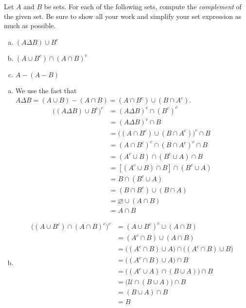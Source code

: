 \documentclass[11pt,letterpaper]{article}
\begin{document}

 Let $A$ and $B$ be sets. For each of the following sets, compute the \textit{complement} of the given set. Be sure to show all your work and simplify your set expression as much as possible. 
	\begin{enumerate}[(a)]
	\item $(A \Delta B) \cup B^c$
	\item $(A \cup B^c) \cap (A \cap B)^c$
	\item$A - (A - B)$
	\end{enumerate} \pspace

\sol 
\begin{enumerate}[(a)]
\item We use the fact that $A \Delta B= (A \cup B) - (A \cap B)= (A \cap B^c) \cup (B \cap A^c)$. 
	\[
	\begin{aligned}
	\big( (A \Delta B) \cup B^c \big)^c&= (A \Delta B)^c \cap (B^c)^c \\
	&= (A \Delta B)^c \cap B \\
	&= \big( (A \cap B^c) \cup (B \cap A^c) \big)^c \cap B \\
	&= (A \cap B^c)^c \cap (B \cap A^c)^c \cap B \\
	&= (A^c \cup B) \cap (B^c \cup A) \cap B \\
	&= \left[ (A^c \cup B) \cap B \right] \cap (B^c \cup A) \\
	&= B \cap (B^c \cup A) \\
	&= (B \cap B^c) \cup (B \cap A) \\
	&= \varnothing \cup (A \cap B) \\
	&= A \cap B
	\end{aligned}
	\] \pspace

\item 
	\[
	\begin{aligned}
	\big( (A \cup B^c) \cap (A \cap B)^c \big)^c&= (A \cup B^c)^c \cup (A \cap B) \\
	&= (A^c \cap B) \cup (A \cap B) \\
	&= \big( (A^c \cap B) \cup A \big) \cap \big( (A^c \cap B) \cup B \big) \\
	&= \big( (A^c \cap B) \cup A \big) \cap B \\
	&= \big( (A^c \cup A) \cap (B \cup A) \big) \cap B \\
	&= \big( \mathcal{U} \cap (B \cup A) \big) \cap B \\
	&= (B \cup A) \cap B \\
	&= B
	\end{aligned}
	\] 


\end{enumerate}
\end{document}
